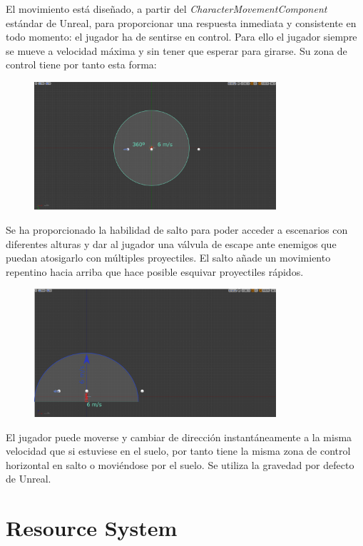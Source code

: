\documentclass[12pt]{report}
\begin{document}
El movimiento está diseñado, a partir del \textit{\emph{CharacterMovementComponent}} estándar de Unreal, para proporcionar una respuesta inmediata y consistente en todo momento: el jugador ha de sentirse en control. Para ello el jugador siempre se mueve a velocidad máxima y sin tener que esperar para girarse. Su zona de control tiene por tanto esta forma:

\begin{figure}[H]
    \centering
    \includegraphics[width=0.8\textwidth]{movement}
\end{figure}

Se ha proporcionado la habilidad de salto para poder acceder a escenarios con diferentes alturas y dar al jugador una válvula de escape ante enemigos que puedan atosigarlo con múltiples proyectiles. El salto añade un movimiento repentino hacia arriba que hace posible esquivar proyectiles rápidos. 

\begin{figure}[H]
    \centering
    \includegraphics[width=0.8\textwidth]{movement_jump}
\end{figure}

El jugador puede moverse y cambiar de dirección instantáneamente a la misma velocidad que si estuviese en el suelo, por tanto tiene la misma zona de control horizontal en salto o moviéndose por el suelo. Se utiliza la gravedad por defecto de Unreal.

\section{Resource System}
\end{document}
